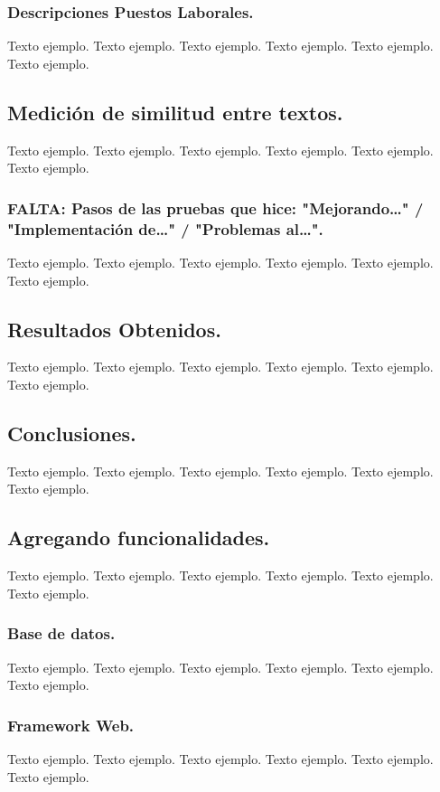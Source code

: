 \documentclass[12pt,a4paper]{article}
\begin{document}
\subsubsection{Descripciones Puestos Laborales.}
Texto ejemplo. Texto ejemplo. Texto ejemplo. Texto ejemplo. Texto ejemplo. Texto ejemplo.

\subsection{Medición de similitud entre textos.}
Texto ejemplo. Texto ejemplo. Texto ejemplo. Texto ejemplo. Texto ejemplo. Texto ejemplo.

\subsubsection{FALTA: Pasos de las pruebas que hice: "Mejorando…" / "Implementación de…" / "Problemas al…".}
Texto ejemplo. Texto ejemplo. Texto ejemplo. Texto ejemplo. Texto ejemplo. Texto ejemplo.

\subsection{Resultados Obtenidos.}
Texto ejemplo. Texto ejemplo. Texto ejemplo. Texto ejemplo. Texto ejemplo. Texto ejemplo.

\subsection{Conclusiones.}
Texto ejemplo. Texto ejemplo. Texto ejemplo. Texto ejemplo. Texto ejemplo. Texto ejemplo.

\subsection{Agregando funcionalidades.}
Texto ejemplo. Texto ejemplo. Texto ejemplo. Texto ejemplo. Texto ejemplo. Texto ejemplo.

\subsubsection{Base de datos.}
Texto ejemplo. Texto ejemplo. Texto ejemplo. Texto ejemplo. Texto ejemplo. Texto ejemplo.

\subsubsection{Framework Web.}
Texto ejemplo. Texto ejemplo. Texto ejemplo. Texto ejemplo. Texto ejemplo. Texto ejemplo.
\end{document}
